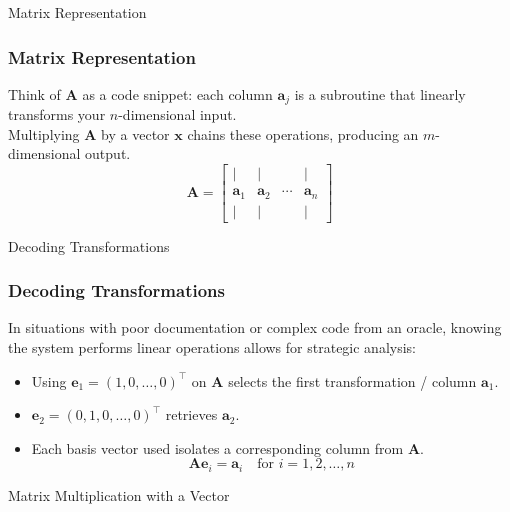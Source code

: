 \documentclass[aspectratio=169]{beamer}
\begin{document}
\begin{frame}{Matrix Representation}
  \frametitle{Matrix Representation}
  Think of $\mathbf{A}$ as a code snippet: each column $\mathbf{a}_j$ is a subroutine that linearly transforms your $n$-dimensional input. \\[1cm] \pause
  Multiplying $\mathbf{A}$ by a vector $\mathbf{x}$ chains these operations, producing an $m$-dimensional output.
  \[
  \mathbf{A} = \begin{bmatrix}
  | & | & & | \\
  \mathbf{a}_1 & \mathbf{a}_2 & \cdots & \mathbf{a}_n \\
  | & | & & |
  \end{bmatrix}
  \]
\end{frame}

\begin{frame}{Decoding Transformations}
  \frametitle{Decoding Transformations}
  In situations with poor documentation or complex code from an oracle, knowing the system performs linear operations allows for strategic analysis:
  \begin{itemize}
    \item<2-> Using $\mathbf{e}_1 = (1, 0, \ldots, 0)^\top$ on $\mathbf{A}$ selects the first transformation / column $\mathbf{a}_1$.
    \item<3-> $\mathbf{e}_2 = (0, 1, 0, \ldots, 0)^\top$ retrieves $\mathbf{a}_2$.
    \item<4-> Each basis vector used isolates a corresponding column from $\mathbf{A}$.
  \[
  \mathbf{A}\mathbf{e}_i = \mathbf{a}_i \quad \text{for } i = 1, 2, \ldots, n
  \]\end{itemize}
  
\end{frame}

\begin{frame}{Matrix Multiplication with a Vector}
\begin{center}
\end{center}
\end{frame}
\end{document}
